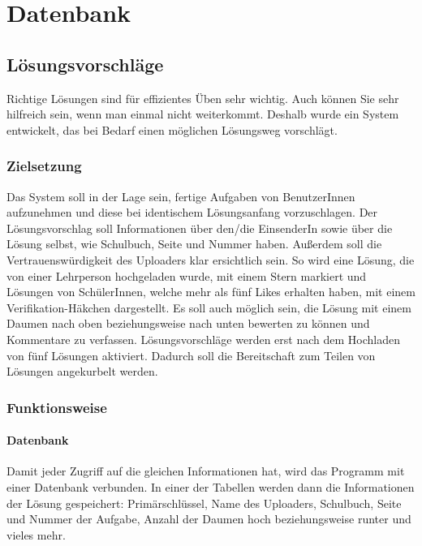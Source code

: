\documentclass[12pt]{report}
\begin{document}
\part{Datenbank}


\chapter{Lösungsvorschläge}
\lhead{\thepage}
 
Richtige Lösungen sind für effizientes Üben sehr wichtig. Auch können Sie sehr hilfreich sein, wenn man einmal nicht weiterkommt. Deshalb wurde ein System entwickelt, das bei Bedarf einen möglichen Lösungsweg vorschlägt.

\section{Zielsetzung}
Das System soll in der Lage sein, fertige Aufgaben von BenutzerInnen aufzunehmen und diese bei identischem Lösungsanfang vorzuschlagen. Der Lösungsvorschlag soll Informationen über den/die EinsenderIn sowie über die Lösung selbst, wie Schulbuch, Seite und Nummer haben. Außerdem soll die Vertrauenswürdigkeit des Uploaders klar ersichtlich sein. So wird eine Lösung, die von einer Lehrperson hochgeladen wurde, mit einem Stern markiert und Lösungen von SchülerInnen, welche mehr als fünf Likes erhalten haben, mit einem Verifikation-Häkchen dargestellt. Es soll auch möglich sein, die Lösung mit einem Daumen nach oben beziehungsweise nach unten bewerten zu können und Kommentare zu verfassen. Lösungsvorschläge werden erst nach dem Hochladen von fünf Lösungen aktiviert. Dadurch soll die Bereitschaft zum Teilen von Lösungen angekurbelt werden.

\section{Funktionsweise}

\subsection{Datenbank}
Damit jeder Zugriff auf die gleichen Informationen hat, wird das Programm mit einer Datenbank verbunden. In einer der Tabellen werden dann die Informationen der Lösung gespeichert: Primärschlüssel, Name des Uploaders, Schulbuch, Seite und Nummer der Aufgabe, Anzahl der Daumen hoch beziehungsweise runter und vieles mehr.
\end{document}
